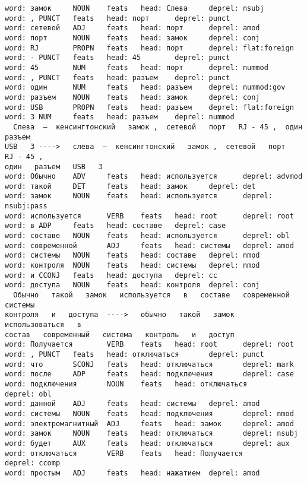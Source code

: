 \documentclass[11pt]{article}
\begin{document}
\begin{Verbatim}[commandchars=\\\{\}]
word: замок     NOUN    feats   head: Слева     deprel: nsubj
word: , PUNCT   feats   head: порт      deprel: punct
word: сетевой   ADJ     feats   head: порт      deprel: amod
word: порт      NOUN    feats   head: замок     deprel: conj
word: RJ        PROPN   feats   head: порт      deprel: flat:foreign
word: - PUNCT   feats   head: 45        deprel: punct
word: 45        NUM     feats   head: порт      deprel: nummod
word: , PUNCT   feats   head: разъем    deprel: punct
word: один      NUM     feats   head: разъем    deprel: nummod:gov
word: разъем    NOUN    feats   head: замок     deprel: conj
word: USB       PROPN   feats   head: разъем    deprel: flat:foreign
word: 3 NUM     feats   head: разъем    deprel: nummod
  Слева  –  кенсингтонский   замок ,  сетевой   порт   RJ - 45 ,  один   разъем
USB   3 ---->   слева  –  кенсингтонский   замок ,  сетевой   порт   RJ - 45 ,
один   разъем   USB   3
word: Обычно    ADV     feats   head: используется      deprel: advmod
word: такой     DET     feats   head: замок     deprel: det
word: замок     NOUN    feats   head: используется      deprel: nsubj:pass
word: используется      VERB    feats   head: root      deprel: root
word: в ADP     feats   head: составе   deprel: case
word: составе   NOUN    feats   head: используется      deprel: obl
word: современной       ADJ     feats   head: системы   deprel: amod
word: системы   NOUN    feats   head: составе   deprel: nmod
word: контроля  NOUN    feats   head: системы   deprel: nmod
word: и CCONJ   feats   head: доступа   deprel: cc
word: доступа   NOUN    feats   head: контроля  deprel: conj
  Обычно   такой   замок   используется   в   составе   современной   системы
контроля   и   доступа  ---->   обычно   такой   замок   использоваться   в
состав   современный   система   контроль   и   доступ
word: Получается        VERB    feats   head: root      deprel: root
word: , PUNCT   feats   head: отключаться       deprel: punct
word: что       SCONJ   feats   head: отключаться       deprel: mark
word: после     ADP     feats   head: подключения       deprel: case
word: подключения       NOUN    feats   head: отключаться       deprel: obl
word: данной    ADJ     feats   head: системы   deprel: amod
word: системы   NOUN    feats   head: подключения       deprel: nmod
word: электромагнитный  ADJ     feats   head: замок     deprel: amod
word: замок     NOUN    feats   head: отключаться       deprel: nsubj
word: будет     AUX     feats   head: отключаться       deprel: aux
word: отключаться       VERB    feats   head: Получается        deprel: ccomp
word: простым   ADJ     feats   head: нажатием  deprel: amod

\end{Verbatim}
\end{document}
